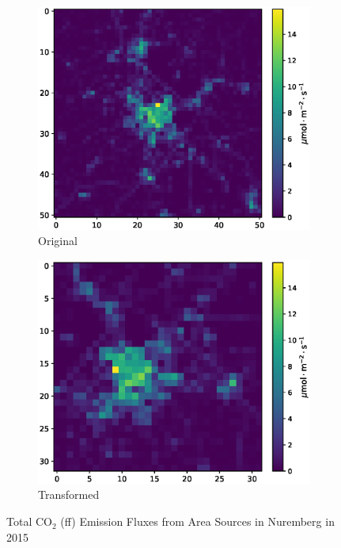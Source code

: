 \begin{figure}[h!]
    \centering
    \begin{subfigure}{0.4\textwidth}
        \centering
        \includegraphics[width=\linewidth]{figures/03_dataset/nuernberg/nuernberg.eps}
        \caption{Original}
    \end{subfigure}
    \begin{subfigure}{0.4\textwidth}
        \centering
        \includegraphics[width=\linewidth]{figures/03_dataset/nuernberg/nuernberg_transformed.eps}
        \caption{Transformed}
    \end{subfigure}
    \caption{Total $\text{CO}_2$ (ff) Emission Fluxes from Area Sources in Nuremberg in 2015 \parencite{TNO_HighRes15}}
    \label{fig:nuernberg_emissions}
\end{figure}


